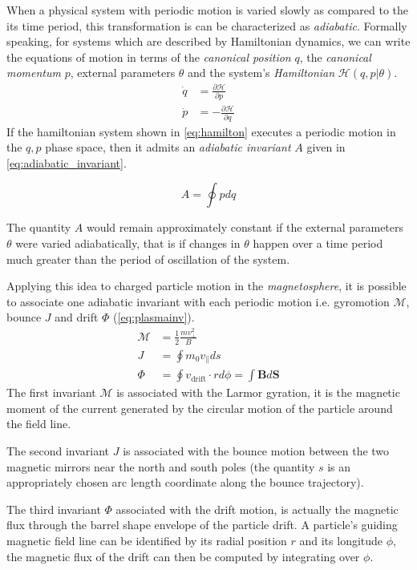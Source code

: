 When a physical system with periodic motion is varied slowly as compared to the its time period, this 
transformation is can be characterized as \emph{adiabatic}. Formally speaking, for systems which are described by 
Hamiltonian dynamics, we can write the equations of motion in terms of the \emph{canonical position} $q$, 
the \emph{canonical momentum} $p$, external parameters $\theta$ and the system's \emph{Hamiltonian} 
$\mathcal{H}(q,p|\theta)$. 
%
\begin{align}\label{eq:hamilton}
    \dot q &= \frac{\partial \mathcal{H}}{\partial p}\\
    \dot p &= - \frac{\partial \mathcal{H}}{\partial q}
\end{align}
%
If the hamiltonian system shown in \cref{eq:hamilton} executes a periodic motion in the $q,p$ phase space, 
then it admits an \emph{adiabatic invariant} $A$ given in \cref{eq:adiabatic_invariant}.

\begin{equation}\label{eq:adiabatic_invariant}
    A = \oint p d q
\end{equation}

The quantity $A$ would remain approximately constant if the external parameters $\theta$ were varied adiabatically, 
that is if changes in $\theta$ happen over a time period much greater than the period of oscillation of the system.

Applying this idea to charged particle motion in the \emph{magnetosphere}, it is possible to associate one 
adiabatic invariant with each periodic motion i.e. gyromotion $\mathcal{M}$, bounce $J$ and drift 
$\Phi$ (\cref{eq:plasmainv}). 
%
\begin{align}\label{eq:plasmainv}
    \mathcal{M} &= \frac{1}{2}\frac{mv^{2}_{\perp}}{B} \\
    J &= \oint{m_0 v_{\parallel}ds} \\
    \Phi &= \oint{v_{\text{drift}} \cdot r d\phi} = \int{\mathbf{B} d\mathbf{S}}
\end{align}
%
The first invariant $\mathcal{M}$ is associated with the Larmor gyration, it is the magnetic moment of the 
current generated by the circular motion of the particle around the field line. 

The second invariant $J$ is associated with the bounce motion between the two magnetic mirrors near the north and 
south poles (the quantity $s$ is an appropriately chosen arc length coordinate along the bounce trajectory). 

The third invariant $\Phi$ associated with the drift motion, is actually the magnetic flux through the barrel 
shape envelope of the particle drift. A particle's guiding magnetic field line can be identified by its radial 
position $r$ and its longitude $\phi$, the magnetic flux of the drift can then be computed by integrating over 
$\phi$.

